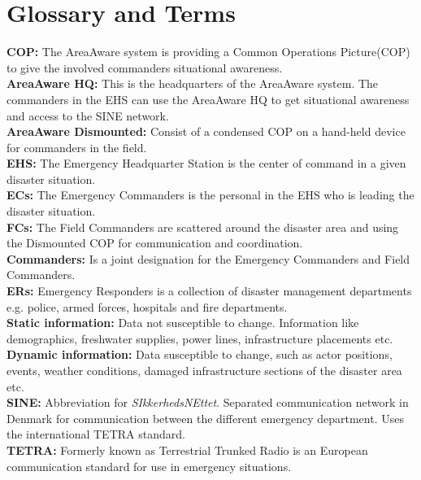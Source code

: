 
\chapter{Glossary and Terms}

\textbf{COP:} The AreaAware system is providing a Common Operations Picture(COP) to give the involved commanders situational awareness.\\

\noindent \textbf{AreaAware HQ:} This is the headquarters of the AreaAware system. The commanders in the EHS can use the AreaAware HQ to get situational awareness and access to the SINE network.\\

\noindent \textbf{AreaAware Dismounted:} Consist of a condensed COP on a hand-held device for commanders in the field.\\

\noindent \textbf{EHS:} The Emergency Headquarter Station is the center of command in a given disaster situation.\\

\noindent \textbf{ECs:} The Emergency Commanders is the personal in the EHS who is leading the disaster situation.\\

\noindent \textbf{FCs:} The Field Commanders are scattered around the disaster area and using the Dismounted COP for communication and coordination.\\

\noindent \textbf{Commanders:} Is a joint designation for the Emergency Commanders and Field Commanders.\\

\noindent \textbf{ERs:} Emergency Responders is a collection of disaster management departments e.g. police, armed forces, hospitals and fire departments.\\

\noindent \textbf{Static information:} Data not susceptible to change. Information like demographics, freshwater supplies, power lines, infrastructure placements etc.\\

\noindent \textbf{Dynamic information:} Data susceptible to change, such as actor positions, events, weather conditions, damaged infrastructure sections of the disaster area etc.\\

\noindent \textbf{SINE:} Abbreviation for \textit{SIkkerhedsNEttet}. Separated communication network in Denmark for communication between the different emergency department. Uses the international TETRA standard.\\

\noindent \textbf{TETRA:} Formerly known as Terrestrial Trunked Radio is an European communication standard for use in emergency situations.\\
